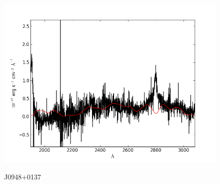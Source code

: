 \documentclass[usenatbib]{mn2e}
\begin{document}
\begin{figure}
\begin{center}
\vspace{5mm}
\includegraphics[width=0.49\linewidth,angle=0]{./red/fe_fit_SBB_15.png}\\

\end{center} 
\caption{J0948+0137 \label{fig:landscape}}   
\end{figure}
\end{document}
